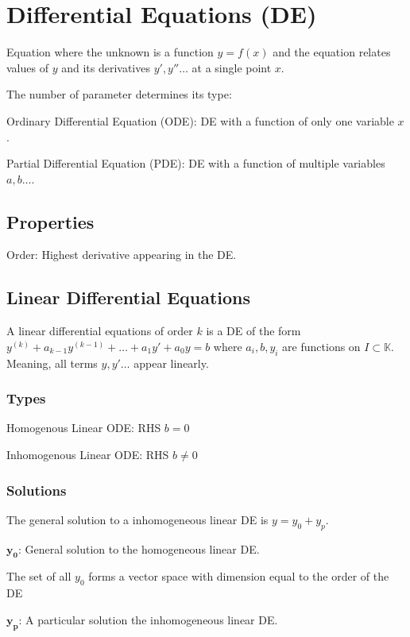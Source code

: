 
\section{Differential Equations (DE)}
Equation where the unknown is a function $y = f(x)$ and the equation relates values of $y$ and its derivatives $y', y'' \dots$ at a single point $x$.

The number of parameter determines its type:
\begin{compactdesc}
    \item[Ordinary Differential Equation (ODE):] DE with a function of only one variable $x$.
    \item[Partial Differential Equation (PDE):] DE with a function of multiple variables $a, b \dots$.
\end{compactdesc}

\subsection{Properties}
\begin{compactdesc}
    \item[Order:] Highest derivative appearing in the DE.
\end{compactdesc}

\subsection{Linear Differential Equations}
A linear differential equations of order $k$ is a DE of the form $y^{(k)} + a_{k - 1}y^{(k - 1)} + \dots + a_1y' + a_0y = b$ where $a_i, b, y_i$ are functions on $I \subset \mathbb{K}$. Meaning, all terms $y, y' \dots$ appear linearly.

\subsubsection{Types}
\begin{compactdesc}
    \item[Homogenous Linear ODE:] RHS $b = 0$
    \item[Inhomogenous Linear ODE:] RHS $b \neq 0$
\end{compactdesc}

\subsubsection{Solutions}
The general solution to a inhomogeneous linear DE is $y = y_0 + y_p$.
\begin{compactdesc}
    \item[$\mathbf{y_0}$:] General solution to the homogeneous linear DE.
        \begin{compactitem}
            \item The set of all $y_0$ forms a vector space with dimension equal to the order of the DE
        \end{compactitem}
    \item[$\mathbf{y_p}$:] A particular solution the inhomogeneous linear DE.
\end{compactdesc}

